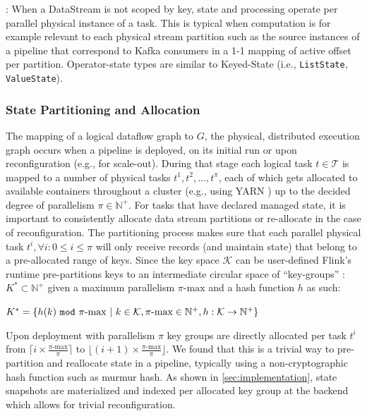 : When a DataStream is not scoped by key, state and processing operate per parallel physical instance of a task. This is typical when computation is for example relevant to each physical stream partition such as the source instances of a pipeline that correspond to Kafka consumers in a 1-1 mapping of active offset per partition. Operator-state types are similar to Keyed-State (i.e., \texttt{ListState}, \texttt{ValueState}). 

\subsubsection{State Partitioning and Allocation}

The mapping of a logical dataflow graph to $G$, the physical, distributed execution graph occurs when a pipeline is deployed, on its initial run or upon reconfiguration (e.g., for scale-out). During that stage each logical task $t \in \mathcal{T}$ is mapped to a number of physical tasks $t^1, t^2, \ldots, t^\pi$, each of which gets allocated to available containers throughout a cluster (e.g., using YARN \cite{vavilapalli2013apache}) up to the decided degree of parallelism $\pi \in \mathbb{N^+}$. For tasks that have declared managed state, it is important to consistently allocate data stream partitions or re-allocate in the case of reconfiguration. The partitioning process makes sure that each parallel physical task $t^i , \forall i : 0 \leq i \leq \pi$ will only receive records (and maintain state) that belong to a pre-allocated range of keys. Since the key space $\mathcal{K}$ can be user-defined Flink's runtime pre-partitions keys to an intermediate circular space of ``key-groups'' : $K^* \subset \mathbb{N^+}$ given a maximum parallelism $\pi\text{-max}$ and a hash function $h$ as such:

\noindent $K^* = \{ h(k)\text{ \texttt{mod} }\pi\text{-max}\text{ }|\text{ }k \in \mathcal{K}, \pi\text{-max} \in \mathbb{N^+}, h: \mathcal{K} \rightarrow \mathbb{N^+} \}$

Upon deployment with parallelism $\pi$ key groups are directly allocated per task $t^i$ from $\lceil i \times \frac{\pi\text{-max}}{\pi} \rceil$ to $\lfloor (i+1) \times \frac{\pi\text{-max}}{\pi} \rfloor$. We found that this is a trivial way to pre-partition and reallocate state in a pipeline, typically using a non-cryptographic hash function such as murmur hash. As shown in \autoref{sec:implementation}, state snapshots are materialized and indexed per allocated key group at the backend which allows for trivial reconfiguration. 

